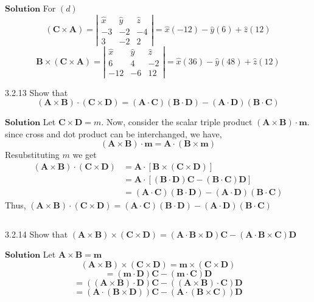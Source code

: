 $\boxed{\textbf{Solution}}$ For $(d)$ 
$$(\mathbf{C} \times \mathbf{A})=\left|\begin{array}{ccc}\hat{x} & \hat{y} & \hat{z} \\ -3 & -2 & -4 \\ 3 & -2 & 2\end{array}\right|=\hat{x}(-12)-\hat{y}(6)+\hat{z}(12)$$
$$\mathbf{B} \times(\mathbf{C} \times \mathbf{A})=\left|\begin{array}{ccc}\hat{x} & \hat{y} & \hat{z} \\ 6 & 4 & -2 \\ -12 & -6 & 12\end{array}\right|=\hat{x}(36)-\hat{y}(48)+\hat{z}(12)$$

\newpage


\begin{mybox}{3.2.13}
Show that
$$
(\mathbf{A} \times \mathbf{B}) \cdot(\mathbf{C} \times \mathbf{D})=(\mathbf{A} \cdot \mathbf{C})(\mathbf{B} \cdot \mathbf{D})-(\mathbf{A} \cdot \mathbf{D})(\mathbf{B} \cdot \mathbf{C})
$$
\end{mybox}

$\boxed{\textbf{Solution}}$ Let $\mathbf{C} \times \mathbf{D}=m$.
Now, consider the scalar triple product $(\mathbf{A} \times \mathbf{B}) \cdot \mathbf{m}$.
since cross and dot product can be interchanged, we have,
$$
(\mathbf{A} \times \mathbf{B}) \cdot \mathbf{m}=\mathbf{A} \cdot(\mathbf{B} \times \mathbf{m})
$$
Resubstituting $m$ we get
$$\begin{aligned}(\mathbf{A} \times \mathbf{B}) \cdot(\mathbf{C} \times \mathbf{D}) &=\mathbf{A} \cdot[\mathbf{B} \times(\mathbf{C} \times \mathbf{D})] \\ &=\mathbf{A} \cdot[(\mathbf{B} \cdot \mathbf{D}) \mathbf{C}-(\mathbf{B} \cdot \mathbf{C})\mathbf{D}] \\ &=(\mathbf{A} \cdot \mathbf{C})(\mathbf{B} \cdot \mathbf{D})-(\mathbf{A} \cdot \mathbf{D})(\mathbf{B} \cdot \mathbf{C}) \end{aligned}$$
Thus, $(\mathbf{A} \times \mathbf{B}) \cdot(\mathbf{C} \times \mathbf{D})=(\mathbf{A} \cdot \mathbf{C})(\mathbf{B} \cdot \mathbf{D})-(\mathbf{A} \cdot \mathbf{D})(\mathbf{B} \cdot \mathbf{C})$

$$$$

\begin{mybox}{3.2.14}
Show that
$(\mathbf{A} \times \mathbf{B}) \times(\mathbf{C} \times \mathbf{D})=(\mathbf{A} \cdot \mathbf{B} \times \mathbf{D}) \mathbf{C}-(\mathbf{A} \cdot \mathbf{B} \times \mathbf{C}) \mathbf{D}$
\end{mybox}
$\boxed{\textbf{Solution}}$ Let $\mathbf{A} \times \mathbf{B}=\mathbf{m}$
$$(\mathbf{A} \times \mathbf{B}) \times(\mathbf{C} \times \mathbf{D})=\mathbf{m} \times(\mathbf{C} \times \mathbf{D})$$
$$=(\mathbf{m} \cdot \mathbf{D}) \mathbf{C}-(\mathbf{m} \cdot \mathbf{C})\mathbf{D}$$
$$=((\mathbf{A} \times \mathbf{B}) \cdot \mathbf{D}) \mathbf{C}-((\mathbf{A} \times \mathbf{B}) \cdot \mathbf{C})\mathbf{D}$$
$$=(\mathbf{A} \cdot(\mathbf{B} \times \mathbf{D})) \mathbf{C}-(\mathbf{A} \cdot(\mathbf{B} \times \mathbf{C}))\mathbf{D}$$


